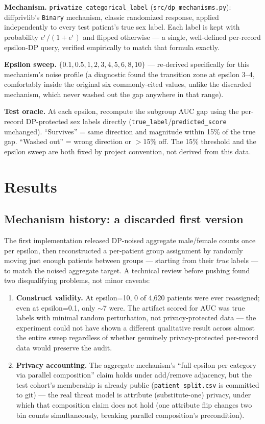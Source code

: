 \documentclass[11pt]{article}
\begin{document}
\textbf{Mechanism.} \texttt{privatize\_categorical\_label} (\texttt{src/dp\_mechanisms.py}): diffprivlib's \texttt{Binary} mechanism, classic randomized response, applied independently to every test patient's true sex label. Each label is kept with probability $e^\epsilon/(1+e^\epsilon)$ and flipped otherwise --- a single, well-defined per-record epsilon-DP query, verified empirically to match that formula exactly.

\textbf{Epsilon sweep.} $\{0.1, 0.5, 1, 2, 3, 4, 5, 6, 8, 10\}$ --- re-derived specifically for this mechanism's noise profile (a diagnostic found the transition zone at epsilon 3--4, comfortably inside the original six commonly-cited values, unlike the discarded mechanism, which never washed out the gap anywhere in that range).

\textbf{Test oracle.} At each epsilon, recompute the subgroup AUC gap using the per-record DP-protected sex labels directly (\texttt{true\_label}/\texttt{predicted\_score} unchanged). ``Survives'' = same direction and magnitude within 15\% of the true gap. ``Washed out'' = wrong direction or $>$15\% off. The 15\% threshold and the epsilon sweep are both fixed by project convention, not derived from this data.

\section{Results}

\subsection{Mechanism history: a discarded first version}
\label{sec:mechanism-history}

The first implementation released DP-noised aggregate male/female counts once per epsilon, then reconstructed a per-patient group assignment by randomly moving just enough patients between groups --- starting from their \emph{true} labels --- to match the noised aggregate target. A technical review before pushing found two disqualifying problems, not minor caveats:

\begin{enumerate}
\item \textbf{Construct validity.} At epsilon=10, 0 of 4{,}620 patients were ever reassigned; even at epsilon=0.1, only $\sim$7 were. The artifact scored for AUC was true labels with minimal random perturbation, not privacy-protected data --- the experiment could not have shown a different qualitative result across almost the entire sweep regardless of whether genuinely privacy-protected per-record data would preserve the audit.
\item \textbf{Privacy accounting.} The aggregate mechanism's ``full epsilon per category via parallel composition'' claim holds under add/remove adjacency, but the test cohort's membership is already public (\texttt{patient\_split.csv} is committed to git) --- the real threat model is attribute (substitute-one) privacy, under which that composition claim does not hold (one attribute flip changes two bin counts simultaneously, breaking parallel composition's precondition).
\end{enumerate}
\end{document}
